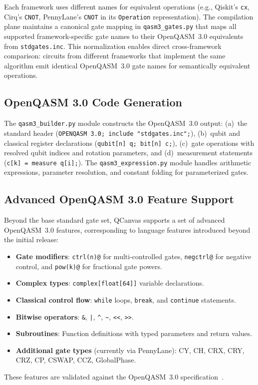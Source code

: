 \documentclass[runningheads]{llncs}
\begin{document}
Each framework uses different names for equivalent operations (e.g., Qiskit's \texttt{cx}, Cirq's \texttt{CNOT}, PennyLane's \texttt{CNOT} in its \texttt{Operation} representation). The compilation plane maintains a canonical gate mapping in \texttt{qasm3\_gates.py} that maps all supported framework-specific gate names to their OpenQASM~3.0 equivalents from \texttt{stdgates.inc}. This normalization enables direct cross-framework comparison: circuits from different frameworks that implement the same algorithm emit identical OpenQASM~3.0 gate names for semantically equivalent operations.

\subsection{OpenQASM 3.0 Code Generation}

The \texttt{qasm3\_builder.py} module constructs the OpenQASM~3.0 output: (a)~the standard header (\texttt{OPENQASM~3.0; include "stdgates.inc";}), (b)~qubit and classical register declarations (\texttt{qubit[n]~q; bit[n]~c;}), (c)~gate operations with resolved qubit indices and rotation parameters, and (d)~measurement statements (\texttt{c[k]~= measure~q[i];}). The \texttt{qasm3\_expression.py} module handles arithmetic expressions, parameter resolution, and constant folding for parameterized gates.

\subsection{Advanced OpenQASM 3.0 Feature Support}

Beyond the base standard gate set, QCanvas supports a set of advanced OpenQASM~3.0 features, corresponding to language features introduced beyond the initial release:
\begin{itemize}
    \item \textbf{Gate modifiers}: \texttt{ctrl(n)@} for multi-controlled gates, \texttt{negctrl@} for negative control, and \texttt{pow(k)@} for fractional gate powers.
    \item \textbf{Complex types}: \texttt{complex[float[64]]} variable declarations.
    \item \textbf{Classical control flow}: \texttt{while} loops, \texttt{break}, and \texttt{continue} statements.
    \item \textbf{Bitwise operators}: \texttt{\&}, \texttt{|}, \texttt{\^{}}, \texttt{\~{}}, \texttt{<<}, \texttt{>>}.
    \item \textbf{Subroutines}: Function definitions with typed parameters and return values.
    \item \textbf{Additional gate types} (currently via PennyLane): CY, CH, CRX, CRY, CRZ, CP, CSWAP, CCZ, GlobalPhase.
\end{itemize}
These features are validated against the OpenQASM~3.0 specification~\cite{cross2022}.
\end{document}
